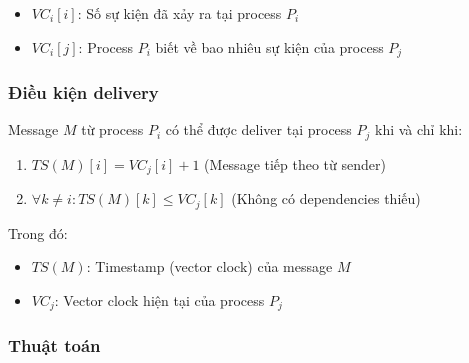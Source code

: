 \begin{itemize}
    \item $VC_i[i]$: Số sự kiện đã xảy ra tại process $P_i$
    \item $VC_i[j]$: Process $P_i$ biết về bao nhiêu sự kiện của process $P_j$
\end{itemize}

\subsubsection{Điều kiện delivery}
Message $M$ từ process $P_i$ có thể được deliver tại process $P_j$ khi và chỉ khi:

\begin{enumerate}
    \item $TS(M)[i] = VC_j[i] + 1$ (Message tiếp theo từ sender)
    \item $\forall k \neq i: TS(M)[k] \leq VC_j[k]$ (Không có dependencies thiếu)
\end{enumerate}

Trong đó:
\begin{itemize}
    \item $TS(M)$: Timestamp (vector clock) của message $M$
    \item $VC_j$: Vector clock hiện tại của process $P_j$
\end{itemize}

\subsubsection{Thuật toán}

\begin{algorithm}[H]
\caption{SES Algorithm - Send Message}
\end{algorithm}

\begin{algorithm}[H]
\caption{SES Algorithm - Receive and Deliver Message}
\end{algorithm}

